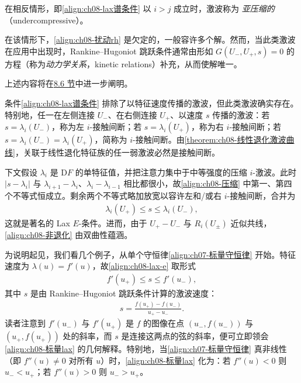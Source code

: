 \documentclass[../../main.tex]{subfiles}
\begin{document}
在相反情形，即\eqref{align:ch08-lax谱条件} 以 $i>j$ 成立时，激波称为 \emph{亚压缩的}（undercompressive）。

在该情形下，\eqref{align:ch08-扰动rh} 是欠定的，一般容许多个解。然而，当此类激波在应用中出现时，Rankine--Hugoniot 跳跃条件通常由形如 $G(U_-,U_+,s)=0$ 的方程（称为\emph{动力学关系}，kinetic relations）补充，从而使解唯一。

上述内容将在\hyperref[section:ch08-黏性激波剖面]{8.6 节}中进一步阐明。

条件\eqref{align:ch08-lax谱条件} 排除了以特征速度传播的激波，但此类激波确实存在。特别地，任一在左侧连接 $U_-$、在右侧连接 $U_+$、以速度 $s$ 传播的激波：若 $s=\lambda_i(U_-)$，称为左 $i$-接触间断；若 $s=\lambda_i(U_+)$，称为右 $i$-接触间断；若 $s=\lambda_i(U_-)=\lambda_i(U_+)$，简称为 $i$-接触间断。由\cref{theorem:ch08-线性退化激波曲线}，关联于线性退化特征族的任一弱激波必然是接触间断。

下文假设 $\lambda_i$ 是 $\mathrm{D}F$ 的单特征值，并把注意力集中于中等强度的压缩 $i$-激波。此时 $|s-\lambda_i|$ 与 $\lambda_{i+1}-\lambda_i$、$\lambda_i-\lambda_{i-1}$ 相比都很小，故\eqref{align:ch08-压缩} 中第一、第四个不等式恒成立。剩余两个不等式略加放宽以容许左和/或右 $i$-接触间断，合并为
\begin{align}
\lambda_i(U_+)\leqslant s\leqslant\lambda_i(U_-),
\label{align:ch08-lax-e}
\end{align}
这就是著名的 Lax $E$-条件。进而，由于 $U_+-U_-$ 与 $R_i(U_\pm)$ 近似共线，\eqref{align:ch08-非退化} 由双曲性蕴涵。

为说明起见，我们看几个例子，从单个守恒律\eqref{align:ch07-标量守恒律} 开始。特征速度为 $\lambda(u)=f'(u)$，故\eqref{align:ch08-lax-e} 取形式
\begin{align}
f'(u_+)\leqslant s\leqslant f'(u_-),
\label{align:ch08-标量lax}
\end{align}
其中 $s$ 是由 Rankine--Hugoniot 跳跃条件计算的激波速度：
\begin{align}
s=\frac{f(u_+)-f(u_-)}{u_+-u_-}.
\label{align:ch08-标量s}
\end{align}
读者注意到 $f'(u_-)$ 与 $f'(u_+)$ 是 $f$ 的图像在点 $(u_-,f(u_-))$ 与 $(u_+,f(u_+))$ 处的斜率，而 $s$ 是连接这两点的弦的斜率，便可立即领会\eqref{align:ch08-标量lax} 的几何解释。特别地，当\eqref{align:ch07-标量守恒律} 真非线性（即 $f''(u)\neq0$ 对所有 $u$）时，\eqref{align:ch08-标量lax} 化为：若 $f''(u)<0$ 则 $u_-<u_+$；若 $f''(u)>0$ 则 $u_->u_+$。
\end{document}
